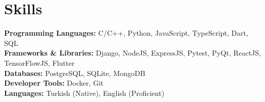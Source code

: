 \section{Skills}
  \vspace{2pt}
  \resumeSubHeadingListStart
    \small{\item{
        \textbf{Programming Languages: }{C/C++, Python, JavaScript, TypeScript, Dart, SQL} \\ 
        \vspace{3pt}
        \textbf{Frameworks \& Libraries: }{Django, NodeJS, ExpressJS, Pytest, PyQt, ReactJS, TensorFlowJS, Flutter} \\ 
        \vspace{3pt}
        \textbf{Databases: }{PostgreSQL, SQLite, MongoDB} \\ 
        \vspace{3pt}
        \textbf{Developer Tools: }{Docker, Git} \\ 
        \vspace{3pt}
        \textbf{Languages: }{Turkish (Native), English (Proficient)} \\ 
        \vspace{3pt}
    }}
  \resumeSubHeadingListEnd

